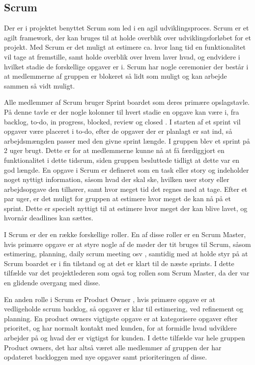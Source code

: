\subsection{Scrum}

Der er i projektet benyttet Scrum  som led i en agil udviklingsproces. Scrum er et agilt framework, der kan bruges til at holde overblik over udviklingsforløbet for et projekt. Med Scrum er det muligt at estimere ca. hvor lang tid en funktionalitet vil tage at fremstille, samt holde overblik over hvem laver hvad, og endvidere i hvilket stadie de forskellige opgaver er i. Scrum har nogle ceremonier der består i at medlemmerne af gruppen er blokeret så lidt som muligt og kan arbejde sammen så vidt muligt.

Alle medlemmer af Scrum bruger Sprint boardet \cite[Sprint board]{converge-terms} som deres primære opslagstavle. På denne tavle er der nogle kolonner til hvert stadie en opgave kan være i, fra backlog, to-do, in progress, blocked, review og closed \cite{atlassian}. I starten af et sprint vil opgaver være placeret i to-do, efter de opgaver der er planlagt er sat ind, så arbejdsmængden passer med den givne sprint længde. I gruppen blev et sprint på 2 uger brugt. Dette er for at medlemmerne kunne nå at få færdiggjort en funktionalitet i dette tidsrum, siden gruppen besluttede tidligt at dette var en god længde. En opgave i Scrum er defineret som en task eller story og indeholder noget nyttigt information, såsom hvad der skal ske, hvilken user story eller arbejdsopgave den tilhører, samt hvor meget tid det regnes med at tage. Efter et par uger, er det muligt for gruppen at estimere hvor meget de kan nå på et sprint. Dette er specielt nyttigt til at estimere hvor meget der kan blive lavet, og hvornår deadlines kan sættes.

I Scrum er der en række forskellige roller. En af disse roller er en Scrum Master, hvis primære opgave er at styre nogle af de møder der tit bruges til Scrum, såsom estimering, planning, daily scrum meeting osv \cite[Scrum Metting]{converge-terms}, samtidig med at holde styr på at Scrum boardet er i fin tilstand og at det er klart til de næste sprints. I dette tilfælde var det projektlederen som også tog rollen som Scrum Master, da der var en glidende overgang med disse.

En anden rolle i Scrum er Product Owner \cite[Product Owner]{converge-terms}, hvis primære opgave er at vedligeholde scrum backlog, så opgaver er klar til estimering, ved refinement \cite[Refinement]{converge-terms} og planning. En product owners vigtigste opgave er at kategorisere opgaver efter prioritet, og har normalt kontakt med kunden, for at formidle hvad udviklere arbejder på og hvad der er vigtigst for kunden. I dette tilfælde var hele gruppen Product owners, det har altså været alle medlemmer af gruppen der har opdateret backloggen med nye opgaver samt prioriteringen af disse.

